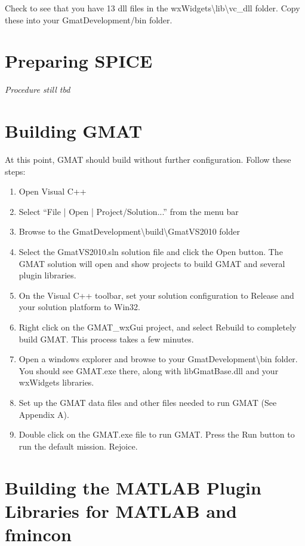\documentclass[letterpaper,10pt]{article}%
\begin{document}
\noindent Check to see that you have 13 dll files in the wxWidgets\textbackslash lib\textbackslash vc\_dll folder.  Copy these into your GmatDevelopment/bin folder.

\section{Preparing SPICE}

\textit{Procedure still tbd}  

\section{Building GMAT}

At this point, GMAT should build without further configuration.  Follow these steps:

\begin{enumerate}
\item Open Visual C++
\item Select ``File | Open | Project/Solution...'' from the menu bar
\item Browse to the GmatDevelopment\textbackslash build\textbackslash GmatVS2010 folder
\item Select the GmatVS2010.sln solution file and click the Open button.  The GMAT solution will open and show projects to build GMAT and several plugin libraries.
\item On the Visual C++ toolbar, set your solution configuration to Release and your solution platform to Win32.
\item Right click on the GMAT\_wxGui project, and select Rebuild to completely build GMAT.  This process takes a few minutes.  
\item Open a windows explorer and browse to your GmatDevelopment\textbackslash bin folder.  You should see GMAT.exe there, along with libGmatBase.dll and your wxWidgets libraries.
\item Set up the GMAT data files and other files needed to run GMAT (See Appendix A).
\item Double click on the GMAT.exe file to run GMAT.  Press the Run button to run the default mission.  Rejoice.
\end{enumerate}

\section{Building the MATLAB Plugin Libraries for MATLAB and fmincon}
\end{document}
